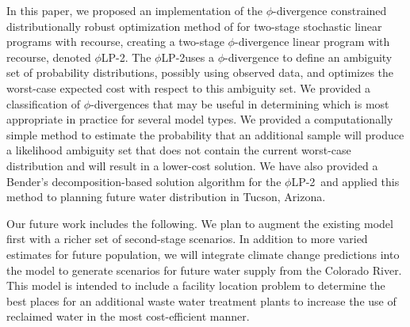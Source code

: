 \documentclass[ijoc,nonblindrev]{informs3} %
\newcommand{\plp}{$\phi$LP-2}
\begin{document}
In this paper, we proposed an implementation of the $\phi$-divergence constrained distributionally robust optimization method of \cite{bental2011robust} for two-stage stochastic linear programs with recourse, creating a two-stage $\phi$-divergence linear program with recourse, denoted \plp.
The \plp uses a $\phi$-divergence to define an ambiguity set of probability distributions, possibly using observed data, and optimizes the worst-case expected cost with respect to this ambiguity set.
We provided a classification of $\phi$-divergences that may be useful in determining which is most appropriate in practice for several model types.
We provided a computationally simple method to estimate the probability that an additional sample will produce a likelihood ambiguity set that does not contain the current worst-case distribution and will result in a lower-cost solution. 
We have also provided a Bender's decomposition-based solution algorithm for the \plp\ and applied this method to planning future water distribution in Tucson, Arizona.

Our future work includes the following. We plan to augment the existing model first with a richer set of second-stage scenarios.
In addition to more varied estimates for future population, we will integrate climate change predictions into the model to generate scenarios for future water supply from the Colorado River. 
This model is intended to include a facility location problem to determine the best places for an additional waste water treatment plants to increase the use of reclaimed water in the most cost-efficient manner.



%
%
%
\end{document}
